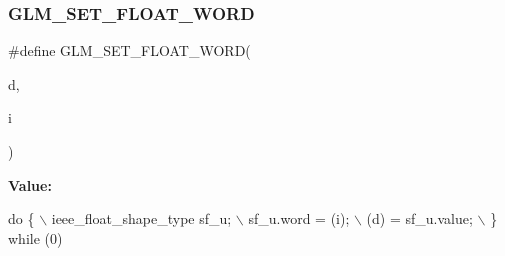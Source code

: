 \subsubsection{\texorpdfstring{G\+L\+M\+\_\+\+S\+E\+T\+\_\+\+F\+L\+O\+A\+T\+\_\+\+W\+O\+RD}{GLM\_SET\_FLOAT\_WORD}}
{\footnotesize\ttfamily \#define G\+L\+M\+\_\+\+S\+E\+T\+\_\+\+F\+L\+O\+A\+T\+\_\+\+W\+O\+RD(\begin{DoxyParamCaption}\item[{}]{d,  }\item[{}]{i }\end{DoxyParamCaption})}

{\bfseries Value\+:}
\begin{DoxyCode}
\textcolor{keywordflow}{do} \{                                    \(\backslash\)
        ieee\_float\_shape\_type sf\_u;         \(\backslash\)
        sf\_u.word = (i);                    \(\backslash\)
        (d) = sf\_u.value;                   \(\backslash\)
    \} \textcolor{keywordflow}{while} (0)
\end{DoxyCode}
